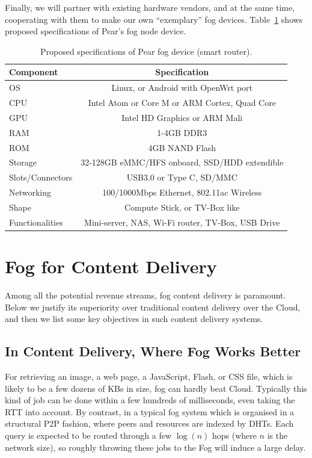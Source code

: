 Finally, we will partner with existing hardware vendors, and at the same time, cooperating with them to make our own ``exemplary'' fog devices. Table~\ref{tb:pear-device-spec} shows proposed specifications of Pear's fog node device. 
\begin{table}[htb]
	\small
	\centering
	\caption{Proposed specifications of Pear fog device (smart router).}\label{tb:pear-device-spec}
	\begin{tabular}{lc}
		\toprule
		Component & Specification\\
		\midrule 
		OS  & Linux, or Android with OpenWrt port\\
		CPU & Intel Atom or Core M or ARM Cortex, Quad Core\\
		GPU & Intel HD Graphics or ARM Mali\\
		RAM & 1-4GB DDR3\\
		ROM & 4GB NAND Flash\\
		Storage & 32-128GB eMMC/HFS onboard, SSD/HDD extendible\\
		Slots/Connectors & USB3.0 or Type C, SD/MMC\\
		Networking & 100/1000Mbps Ethernet, 802.11ac Wireless\\
		Shape & Compute Stick, or TV-Box like\\
		Functionalities & Mini-server, NAS, Wi-Fi router, TV-Box, USB Drive\\
		\bottomrule
	\end{tabular}
\end{table}

\section{Fog for Content Delivery}
Among all the potential revenue streams, fog content delivery is paramount. Below we justify its superiority over traditional content delivery over the Cloud, and then we list some key objectives in such content delivery systems. 
\subsection{In Content Delivery, Where Fog Works Better}  %

For retrieving an image, a web page, a JavaScript, Flash, or CSS file, which is likely to be a few dozens of KBs in size, fog can hardly beat Cloud. Typically this kind of job can be done within a few hundreds of milliseconds, even taking the RTT into account. By contrast, in a typical fog system which is organised in a structural P2P fashion, where peers and resources are indexed by DHTs. Each query is expected to be routed through a few $\log(n)$ hops (where $n$ is the network size), so roughly throwing these jobs to the Fog will induce a large delay. 

